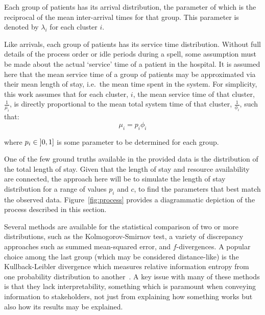 Each group of patients has its arrival distribution, the parameter of which is
the reciprocal of the mean inter-arrival times for that group. This parameter
is denoted by \(\lambda_i\) for each cluster \(i\).

Like arrivals, each group of patients has its service time distribution.
Without full details of the process order or idle periods during a spell, some
assumption must be made about the actual `service' time of a patient in the
hospital. It is assumed here that the mean service time of a group of patients
may be approximated via their mean length of stay, i.e.\ the mean time spent in
the system. For simplicity, this work assumes that for each cluster, \(i\), the
mean service time of that cluster, \(\frac{1}{\mu_i}\), is directly proportional
to the mean total system time of that cluster, \(\frac{1}{\phi_i}\), such that:
\begin{equation}\label{eq:services}
    \mu_i = p_i \phi_i
\end{equation}

\noindent where \(p_i \in \interval[open left]{0}{1}\) is some parameter to be
determined for each group.

One of the few ground truths available in the provided data is the distribution
of the total length of stay. Given that the length of stay and resource
availability are connected, the approach here will be to simulate the length of
stay distribution for a range of values \(p_i\) and \(c\), to find the
parameters that best match the observed data. Figure~\ref{fig:process} provides
a diagrammatic depiction of the process described in this section.

Several methods are available for the statistical comparison of two or more
distributions, such as the Kolmogorov-Smirnov test, a variety of discrepancy
approaches such as summed mean-squared error, and \(f\)-divergences. A popular
choice among the last group (which may be considered distance-like) is the
Kullback-Leibler divergence which measures relative information entropy from one
probability distribution to another~\cite{Kullback1951}. A key issue with many
of these methods is that they lack interpretability, something which is
paramount when conveying information to stakeholders, not just from explaining
how something works but also how its results may be explained.

